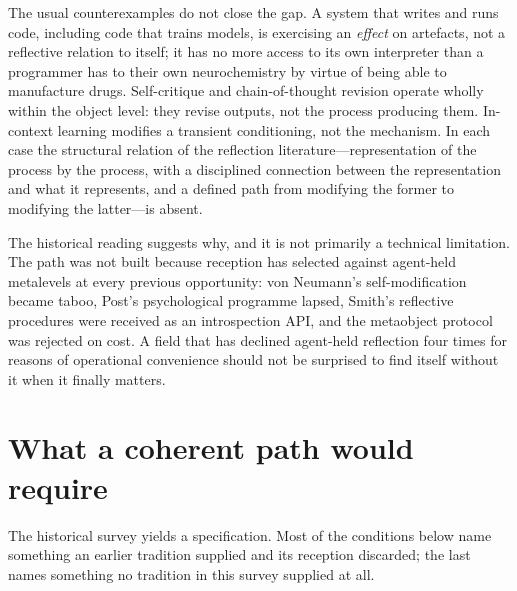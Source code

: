 \documentclass[11pt,a4paper]{article}
\begin{document}
The usual counterexamples do not close the gap. A system that writes and runs code,
including code that trains models, is exercising an \emph{effect} on artefacts, not
a reflective relation to itself; it has no more access to its own interpreter than
a programmer has to their own neurochemistry by virtue of being able to
manufacture drugs. Self-critique and chain-of-thought revision operate wholly
within the object level: they revise outputs, not the process producing them. In-context
learning modifies a transient conditioning, not the mechanism. In each case the
structural relation of the reflection literature---representation of the process by
the process, with a disciplined connection between the representation and what it
represents, and a defined path from modifying the former to modifying the
latter---is absent.

The historical reading suggests why, and it is not primarily a technical
limitation. The path was not built because reception has selected against agent-held
metalevels at every previous opportunity: von Neumann's self-modification became
taboo, Post's psychological programme lapsed, Smith's reflective procedures were
received as an introspection API, and the metaobject protocol was rejected on cost.
A field that has declined agent-held reflection four times for reasons of
operational convenience should not be surprised to find itself without it when it
finally matters.

\section{What a coherent path would require}

The historical survey yields a specification. Most of the conditions below name
something an earlier tradition supplied and its reception discarded; the last
names something no tradition in this survey supplied at all.
\end{document}
